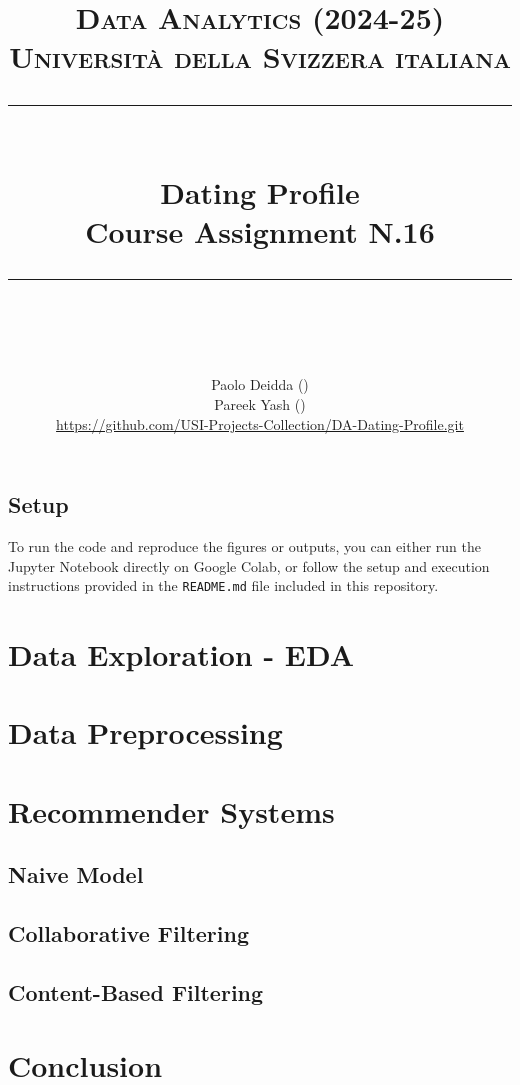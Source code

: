 \documentclass{article}
\title{
	\normalfont\normalsize
	\textsc{Data Analytics (2024-25)\\
	Universit\`a della Svizzera italiana}\\
	\rule{\linewidth}{0.5pt}\\
	{\huge Dating Profile\\
	\small Course Assignment N.16}\\
	\rule{\linewidth}{1pt}\\
	\vspace{5pt}
}
\author{
	Paolo Deidda (\text{paolo.deidda@usi.ch}) \\ 
	Pareek Yash (\text{yash.pareek@usi.ch})\\
	\url{https://github.com/USI-Projects-Collection/DA-Dating-Profile.git}
	}
\begin{document}
\maketitle

\tableofcontents


\vspace*{\fill}

\subsection*{Setup}

To run the code and reproduce the figures or outputs, you can either run the Jupyter Notebook directly on Google Colab, or follow the setup and execution instructions provided in the \texttt{README.md} file included in this repository.



\newpage

\section{Data Exploration - EDA}


\section{Data Preprocessing}



\section{Recommender Systems}
\subsection{Naive Model}

\subsection{Collaborative Filtering}

\subsection{Content-Based Filtering}


\section{Conclusion}

\end{document}
